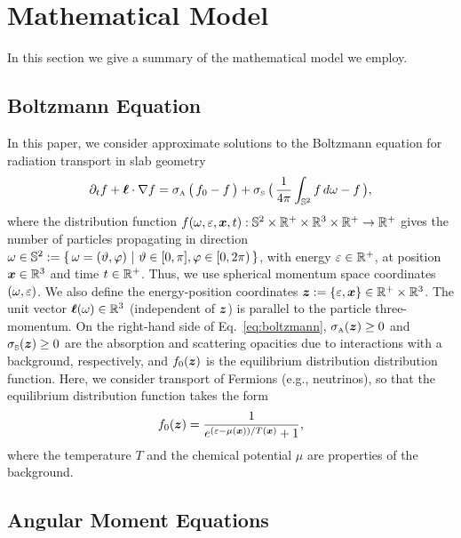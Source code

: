 \section{Mathematical Model}

In this section we give a summary of the mathematical model we employ.  

\subsection{Boltzmann Equation}

In this paper, we consider approximate solutions to the Boltzmann equation for radiation transport in slab geometry
\begin{equation}
  \pd{f}{t}+\vect{\ell}\cdot\nabla f
  =\sigma_{\Ab}\,\big(\,f_{0}-f\,\big)
  +\sigma_{\Scatt}\,\big(\,\f{1}{4\pi}\int_{\bbS^{2}}f\,d\omegaNu-f\,\big),
  \label{eq:boltzmann}
\end{equation}
where the distribution function $f(\omega,\varepsilon,\boldsymbol{x},t):\mathbb{S}^{2}\times\mathbb{R}^{+}\times\mathbb{R}^{3}\times\mathbb{R}^{+}\to\mathbb{R}^{+}$ gives the number of particles propagating in direction $\omega\in\mathbb{S}^{2}:=\{\,\omega=(\vartheta,\varphi)~|~\vartheta\in[0,\pi],\varphi\in[0,2\pi)\,\}$, with energy $\varepsilon\in\mathbb{R}^{+}$, at position $\boldsymbol{x}\in\mathbb{R}^{3}$ and time $t\in\mathbb{R}^{+}$.  
Thus, we use spherical momentum space coordinates $(\omega,\varepsilon)$.  
We also define the energy-position coordinates $\boldsymbol{z}:=\{\varepsilon,\boldsymbol{x}\}\in\mathbb{R}^{+}\times\mathbb{R}^{3}$.  
The unit vector $\boldsymbol{\ell}(\omega)\in\mathbb{R}^{3}$ (independent of $\boldsymbol{z}$) is parallel to the particle three-momentum.  
On the right-hand side of Eq.~\eqref{eq:boltzmann}, $\sigma_{\mbox{\tiny A}}(\boldsymbol{z})\ge0$ and $\sigma_{\mbox{\tiny S}}(\boldsymbol{z})\ge0$ are the absorption and scattering opacities due to interactions with a background, respectively, and $f_{0}(\boldsymbol{z})$ is the equilibrium distribution distribution function.  
Here, we consider transport of Fermions (e.g., neutrinos), so that the equilibrium distribution function takes the form
\begin{equation}
  f_{0}(\vect{z})=\f{1}{e^{(\epsilonNu-\mu(\vect{x}))/T(\vect{x})}+1},  
  \label{eq:fermiDirac}
\end{equation}
where the temperature $T$ and the chemical potential $\mu$ are properties of the background.  

\subsection{Angular Moment Equations}

